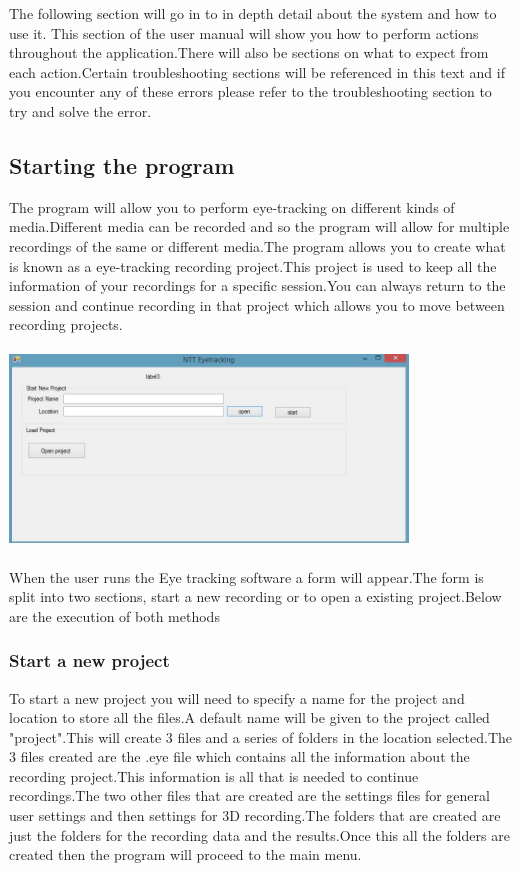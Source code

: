 The following section will go in to in depth detail about the system and how to use it. This section of the user manual will show you how to perform actions throughout the application.There will also be sections on what to expect from each action.Certain troubleshooting sections will be referenced in this text and if you encounter any of these errors please refer to the troubleshooting section to try and solve the error.

\subsection{Starting the program}
The program will allow you to perform eye-tracking on different kinds of media.Different media can be recorded and so the program will allow for multiple recordings of the same or different media.The program allows you to create what is known as a eye-tracking recording project.This project is used to keep all the information of your recordings for a specific session.You can always return to the session and continue recording in that project which allows you to move between recording projects.\newline

\includegraphics[width=400px,height=200px]{./Images/Startpage.JPG}

When the user runs the Eye tracking software a form will appear.The form is split into two sections, start a new recording or to open a existing project.Below are the execution of both methods

\subsubsection{Start a new project} 
To start a new project you will need to specify a name for the project and location to store all the files.A default name will be given to the project called "project".This will create 3 files and a series of folders in the location selected.The 3 files created are the .eye file which contains all the information about the recording project.This information is all that is needed to continue recordings.The two other files that are created are the settings files for general user settings and then settings for 3D recording.The folders that are created are just the folders for the recording data and the results.Once this all the folders are created then the program will proceed to the main menu.
